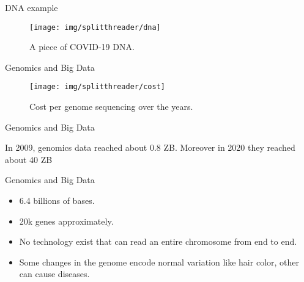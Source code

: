 \documentclass[10pt]{beamer}
\newcommand{\1}{
	\setbeamertemplate{background}{
		\texttt{[image: img/1]}
		\tikz[overlay] \fill[fill opacity=0.75,fill=white] (0,0) rectangle (-\paperwidth,\paperheight);
	}
}
\begin{document}
\begin{frame}{DNA example}{}
	\begin{figure}[H]
		\centering
		\texttt{[image: img/splitthreader/dna]}
		\caption{A piece of COVID-19 DNA.}
		\label{fig:dna}
	\end{figure}
\end{frame}

\begin{frame}{Genomics and Big Data}{}	
	\begin{figure}
		\centering
		\texttt{[image: img/splitthreader/cost]}
		\caption{Cost per genome sequencing over the years.}
	\end{figure}		
\end{frame}

\begin{frame}{Genomics and Big Data}{}	
	\begin{block}{}
		In 2009, genomics data reached about 0.8 ZB. Moreover in 2020 they reached about 40 ZB \cite{prabahar2016perspectives}
	\end{block}		
\end{frame}

\begin{frame}{Genomics and Big Data}{}
	\begin{itemize}
		\item 6.4 billions of bases.
		\item 20k genes approximately.
		\item No technology exist that can read an entire chromosome from end to end.
		\item Some changes in the genome encode normal variation like hair color, other can cause diseases.
	\end{itemize}		
\end{frame}
\end{document}

